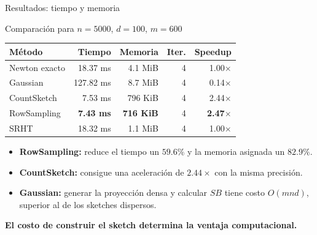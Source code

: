 \documentclass[aspectratio=169,11pt]{beamer}
\begin{document}
\begin{frame}{Resultados: tiempo y memoria}
\small

\begin{block}{Comparación para $n=5000$, $d=100$, $m=600$}
\centering
\scriptsize
\renewcommand{\arraystretch}{1.25}
\begin{tabular}{lrrrr}
\hline
\textbf{Método} & \textbf{Tiempo}
& \textbf{Memoria} & \textbf{Iter.}
& \textbf{Speedup}\\
\hline
Newton exacto & 18.37 ms & 4.1 MiB & 4 & 1.00$\times$\\
Gaussian      & 127.82 ms & 8.7 MiB & 4 & 0.14$\times$\\
CountSketch   & 7.53 ms & 796 KiB & 4 & 2.44$\times$\\
RowSampling   & \textbf{7.43 ms} & \textbf{716 KiB}
              & 4 & \textbf{2.47$\times$}\\
SRHT          & 18.32 ms & 1.1 MiB & 4 & 1.00$\times$\\
\hline
\end{tabular}
\end{block}

\vspace{0.1cm}

\begin{itemize}
    \item \textbf{RowSampling:} reduce el tiempo un
    $59.6\%$ y la memoria asignada un $82.9\%$.

    \item \textbf{CountSketch:} consigue una aceleración
    de $2.44\times$ con la misma precisión.

    \item \textbf{Gaussian:} generar la proyección densa
    y calcular $SB$ tiene costo $O(mnd)$,
    superior al de los sketches dispersos.
\end{itemize}

\vspace{0.1cm}
\centering
\footnotesize
\textcolor{main}{\textbf{El costo de construir el sketch
determina la ventaja computacional.}}

\end{frame}
\end{document}
